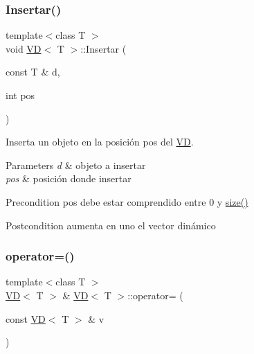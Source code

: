 \mbox{\label{class_v_d_aded65b5f02cceb9780303afd5c88acb8}} 
\subsubsection{\texorpdfstring{Insertar()}{Insertar()}}
{\footnotesize\ttfamily template$<$class T $>$ \\
void \mbox{\hyperlink{class_v_d}{VD}}$<$ T $>$\+::Insertar (\begin{DoxyParamCaption}\item[{const T \&}]{d,  }\item[{int}]{pos }\end{DoxyParamCaption})}



Inserta un objeto en la posición pos del \mbox{\hyperlink{class_v_d}{VD}}. 


\begin{DoxyParams}{Parameters}
{\em d} & objeto a insertar \\
\hline
{\em pos} & posición donde insertar \\
\hline
\end{DoxyParams}
\begin{DoxyPrecond}{Precondition}
pos debe estar comprendido entre 0 y \mbox{\hyperlink{class_v_d_a72e3d07e6d332f9e19512048d9e38c00}{size()}} 
\end{DoxyPrecond}
\begin{DoxyPostcond}{Postcondition}
aumenta en uno el vector dinámico 
\end{DoxyPostcond}
\mbox{\label{class_v_d_a645b65a6343059cd921f6a2856c97249}} 
\subsubsection{\texorpdfstring{operator=()}{operator=()}}
{\footnotesize\ttfamily template$<$class T $>$ \\
\mbox{\hyperlink{class_v_d}{VD}}$<$ T $>$ \& \mbox{\hyperlink{class_v_d}{VD}}$<$ T $>$\+::operator= (\begin{DoxyParamCaption}\item[{const \mbox{\hyperlink{class_v_d}{VD}}$<$ T $>$ \&}]{v }\end{DoxyParamCaption})}



